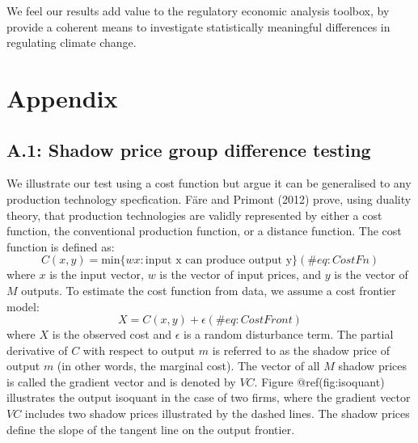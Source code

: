 \documentclass[
  10pt,
]{article}
\begin{document}
We feel our results add value to the regulatory economic analysis
toolbox, by provide a coherent means to investigate statistically
meaningful differences in regulating climate change.

\hypertarget{appendix}{%
\section{Appendix}\label{appendix}}

\hypertarget{a.1-shadow-price-group-difference-testing}{%
\subsection{A.1: Shadow price group difference
testing}\label{a.1-shadow-price-group-difference-testing}}

We illustrate our test using a cost function but argue it can be
generalised to any production technology specfication. Färe and Primont
(2012) prove, using duality theory, that production technologies are
validly represented by either a cost function, the conventional
production function, or a distance function. The cost function is
defined as: \begin{equation}
C(x,y)=\text{min} \{wx:\text{input x can produce output y}\}
(\#eq:CostFn)
\end{equation} where \(x\) is the input vector, \(w\) is the vector of
input prices, and \(y\) is the vector of \(M\) outputs. To estimate the
cost function from data, we assume a cost frontier model:
\begin{equation}
X=C(x,y) + \epsilon
(\#eq:CostFront)
\end{equation} where \(X\) is the observed cost and \(\epsilon\) is a
random disturbance term. The partial derivative of \(C\) with respect to
output \(m\) is referred to as the shadow price of output \(m\) (in
other words, the marginal cost). The vector of all \(M\) shadow prices
is called the gradient vector and is denoted by \(VC\). Figure
@ref(fig:isoquant) illustrates the output isoquant in the case of two
firms, where the gradient vector \(VC\) includes two shadow prices
illustrated by the dashed lines. The shadow prices define the slope of
the tangent line on the output frontier.
\end{document}
